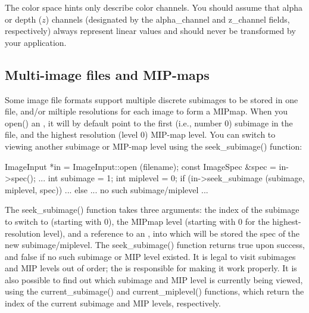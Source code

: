 The color space hints only describe color channels.  You should assume that
alpha or depth ($z$) channels (designated by the {\cf alpha_channel} and
{\cf z_channel} fields, respectively) always represent linear values and
should never be transformed by your application.


%


%


\subsection{Multi-image files and MIP-maps}
\label{sec:imageinput:multiimage}
\label{sec:imageinput:mipmap}

Some image file formats support multiple discrete subimages to be stored
in one file, and/or miltiple resolutions for each image to form a
MIPmap.  When you {\cf open()} an \ImageInput, it will by default point
to the first (i.e., number 0) subimage in the file, and the highest
resolution (level 0) MIP-map level.  You can switch to viewing another
subimage or MIP-map level using the {\cf seek_subimage()} function:

\begin{code}
        ImageInput *in = ImageInput::open (filename);
        const ImageSpec &spec = in->spec();
        ...
        int subimage = 1;
        int miplevel = 0;
        if (in->seek_subimage (subimage, miplevel, spec)) {
            ...
        } else {
            ... no such subimage/miplevel ...
        }
\end{code}

The {\cf seek_subimage()} function takes three arguments: the index of
the subimage to switch to (starting with 0), the MIPmap level (starting
with 0 for the highest-resolution level), and a reference to an
\ImageSpec, into which will be stored the spec of the new
subimage/miplevel.  The {\cf seek_subimage()} function returns {\cf
  true} upon success, and {\cf false} if no such subimage or MIP level
existed.  It is legal to visit subimages and MIP levels out of order;
the \ImageInput is responsible for making it work properly.  It is also
possible to find out which subimage and MIP level is currently being
viewed, using the {\cf current_subimage()} and {\cf current_miplevel()}
functions, which return the index of the current subimage and MIP
levels, respectively.

